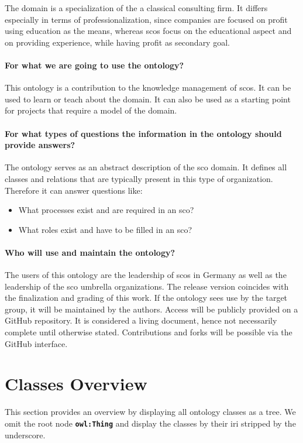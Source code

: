 \documentclass[a4paper, DIV=13, BCOR=0cm]{scrbook}
\newcommand{\class}[1]{\texttt{\textbf{#1}}}
\begin{document}
The domain is a specialization of the a classical consulting firm. It differs especially in terms of professionalization, since companies are focused on profit using education as the means, whereas \glspl{sco} focus on the educational aspect and on providing experience, while having profit as secondary goal.

\paragraph{For what we are going to use the ontology?}
This ontology is a contribution to the knowledge management of \glspl{sco}. It can be used to learn or teach about the domain. It can also be used as a starting point for projects that require a model of the domain.

\paragraph{For what types of questions the information in the ontology should provide answers?}
The ontology serves as an abstract description of the \gls{sco} domain. It defines all classes and relations that are typically present in this type of organization. Therefore it can answer questions like:
\begin{itemize}
	\item What processes exist and are required in an \gls{sco}?
	\item What roles exist and have to be filled in an \gls{sco}?
\end{itemize}

\paragraph{Who will use and maintain the ontology?}
The users of this ontology are the leadership of \glspl{sco} in Germany as well as the leadership of the \gls{sco} umbrella organizations. The release version coincides with the finalization and grading of this work. If the ontology sees use by the target group, it will be maintained by the authors. Access will be publicly provided on a GitHub repository. It is considered a living document, hence not necessarily complete until otherwise stated. Contributions and forks will be possible via the GitHub interface.

\section{Classes Overview}
This section provides an overview by displaying all ontology classes as a tree. 
We omit the root node \class{owl:Thing} and display the classes by their 
\gls{iri} stripped by the underscore.
\end{document}
